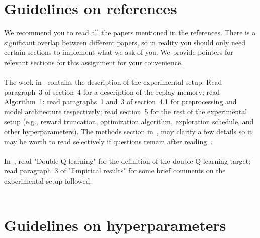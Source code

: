 \documentclass[12pt]{article}
\begin{document}
\section*{Guidelines on references}
We recommend you to read all the papers mentioned in the references. There is a significant overlap between different papers, so in reality you should only need certain sections to implement what we ask of you. We provide pointers for relevant sections for this assignment for your convenience. \\ \\
The work in~\cite{mnih2013playing} contains the description of the experimental setup. Read paragraph~3 of section~4 for a description of the replay memory; read Algorithm~1; read  paragraphs~1 and~3 of section~4.1 for preprocessing and model architecture respectively; read section~5 for the rest of the experimental setup (e.g., reward truncation, optimization algorithm, exploration schedule, and other hyperparameters). The methods section in~\cite{mnih2015human}, may clarify a few details so it may be worth to read selectively if questions remain after reading~\cite{mnih2013playing}. \\ \\
In~\cite{van2016deep}, read "Double Q-learning"  for the definition of the double Q-learning target; read paragraph~3 of "Empirical results" for some brief comments on the experimental setup followed. \\ \\

\section*{Guidelines on hyperparameters}
\end{document}
